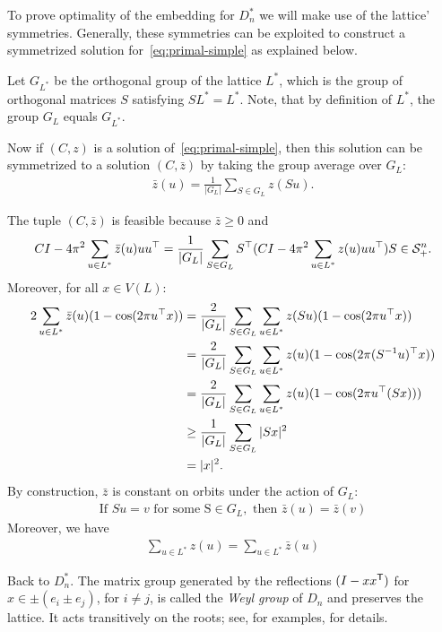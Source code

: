 \documentclass{amsart}
\begin{document}
To prove optimality of the embedding for $ D_n^* $ we will make use of
the lattice' symmetries. Generally, these symmetries
can be exploited to construct a symmetrized solution
for~\eqref{eq:primal-simple} as explained below.

Let $ G_{L^*} $ be the orthogonal group of the lattice $ L^*$, which
is the group of orthogonal matrices $ S $ satisfying $ SL^* = L^*
$. Note, that by definition of $ L^* $, the group $ G_L $ equals $G_{L^*}$.

Now if $ (C,z) $ is a solution of~\eqref{eq:primal-simple}, then this
solution can be symmetrized to a solution $ (C,\bar{z}) $ by taking
the group average over $ G_L $:
\begin{align*}
	\bar{z}(u) = \frac{1}{|G_L|} \sum_{S \in G_L} z(Su). 
\end{align*}

The tuple $ (C,\bar{z}) $ is feasible because $ \bar{z} \ge 0 $ and 
\begin{align*}
	CI - 4\pi^2\sum_{u \in L^*} \bar{z}(u) uu^{\sf{\top}} = \frac{1}{|G_L|} \sum_{S \in G_L} S^{\sf{\top}} (CI - 4\pi^2\sum_{u \in L^*} z(u)  uu^{\sf{\top}} )  S \in \mathcal{S}^n_+. 
\end{align*}
Moreover, for all $ x \in V(L) $: 
\begin{align*}
	2\sum_{u \in L^*} \bar{z}(u) (1-\cos(2\pi u^{\sf{\top}}x)) &= \frac{2}{|G_L|}\sum_{S \in G_L} \sum_{u \in L^*} z(Su) (1-\cos(2\pi u^{\sf{\top}}x))  \\
	&= \frac{2}{|G_L|} \sum_{S \in G_L} \sum_{u \in L^*} z(u) (1-\cos(2\pi (S^{-1}u)^{\sf{\top}}x))    \\
	&= \frac{2}{|G_L|} \sum_{S \in G_L} \sum_{u \in L^*} z(u) (1-\cos(2\pi u^{\sf{\top}}(Sx)))  \\
	&\ge \frac{1}{|G_L|} \sum_{S \in G_L}  |Sx|^2 \\
	&= |x|^2.
\end{align*}
By construction, $ \bar{z} $ is constant on orbits under the action of $ G_L $:
\begin{align}\label{eq:symmetrized-coefficients}
	\text{If } Su = v \text{ for some S} \in G_L, \text{ then } \bar{z}(u) = \bar{z}(v)
\end{align}
Moreover, we have 
\begin{align}\label{eq:no-coefficient-increase}
	\sum_{u \in L^*} z(u) = \sum_{u \in L^*} \bar{z}(u)
\end{align}

Back to $D_n^*$. The matrix group generated by the reflections
$ (I-xx^{\sf T}) $ for $ x \in \pm (e_i \pm e_j) $, for $ i \neq j $,
is called the \emph{Weyl group} of $ D_n $ and preserves the
lattice. It acts transitively on the roots; see, for examples,
\cite[Chapter~1]{Ebeling1994a} for details.
\end{document}
